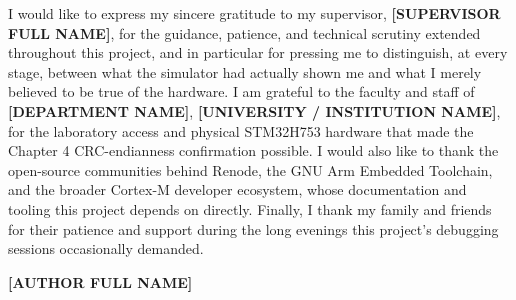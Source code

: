 
I would like to express my sincere gratitude to my supervisor, \textbf{[SUPERVISOR FULL NAME]}, for the guidance, patience, and technical scrutiny extended throughout this project, and in particular for pressing me to distinguish, at every stage, between what the simulator had actually shown me and what I merely believed to be true of the hardware. I am grateful to the faculty and staff of \textbf{[DEPARTMENT NAME]}, \textbf{[UNIVERSITY / INSTITUTION NAME]}, for the laboratory access and physical STM32H753 hardware that made the Chapter 4 CRC-endianness confirmation possible. I would also like to thank the open-source communities behind Renode, the GNU Arm Embedded Toolchain, and the broader Cortex-M developer ecosystem, whose documentation and tooling this project depends on directly. Finally, I thank my family and friends for their patience and support during the long evenings this project's debugging sessions occasionally demanded.

\vspace{1.2cm}
\begin{flushright}
\textbf{[AUTHOR FULL NAME]}
\end{flushright}
